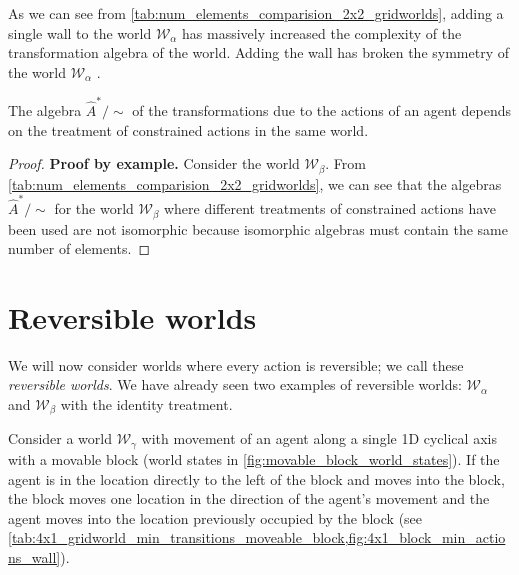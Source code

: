 As we can see from \cref{tab:num_elements_comparision_2x2_gridworlds}, adding a single wall to the world $\mathscr{W}_{\alpha}$ has massively increased the complexity of the transformation algebra of the world.
Adding the wall has broken the symmetry of the world $\mathscr{W}_{\alpha}$
.

\begin{proposition}
    The algebra $\hat{A}^{*}/\sim$ of the transformations due to the actions of an agent depends on the treatment of constrained actions in the same world.
\end{proposition}
\begin{proof}
    \textbf{Proof by example.}
    Consider the world $\mathscr{W}_{\beta}$.
    From \cref{tab:num_elements_comparision_2x2_gridworlds}, we can see that the algebras $\hat{A}^{*}/\sim$ for the world $\mathscr{W}_{\beta}$ where different treatments of constrained actions have been used are not isomorphic because isomorphic algebras must contain the same number of elements.
\end{proof}

\section{Reversible worlds}


We will now consider worlds where every action is reversible; we call these \emph{reversible worlds}.
We have already seen two examples of reversible worlds: $\mathscr{W}_{\alpha}$ and $\mathscr{W}_{\beta}$ with the identity treatment.

Consider a world $\mathscr{W}_{\gamma}$ with movement of an agent along a single 1D cyclical axis with a movable block (world states in \cref{fig:movable_block_world_states}).
If the agent is in the location directly to the left of the block and moves into the block, the block moves one location in the direction of the agent's movement and the agent moves into the location previously occupied by the block (see \cref{tab:4x1_gridworld_min_transitions_moveable_block,fig:4x1_block_min_actions_wall}).


